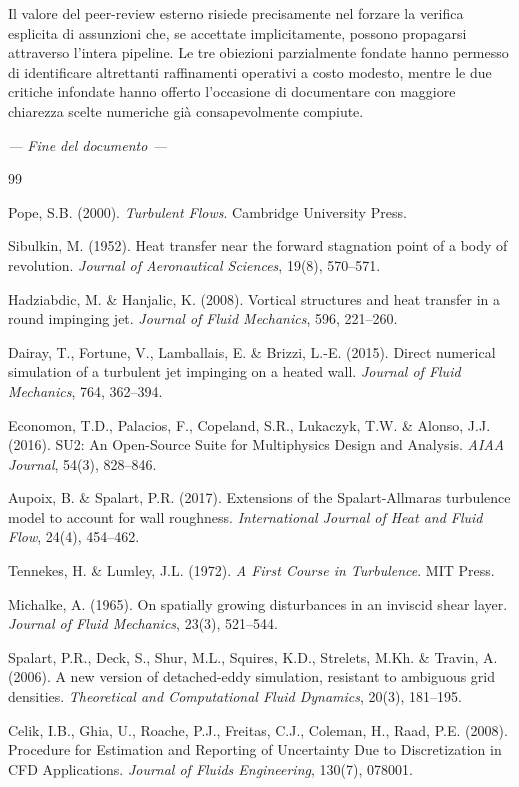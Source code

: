 \documentclass[11pt,a4paper]{article}
\begin{document}
Il valore del peer-review esterno risiede precisamente nel forzare
la verifica esplicita di assunzioni che, se accettate
implicitamente, possono propagarsi attraverso l'intera pipeline.
Le tre obiezioni parzialmente fondate hanno permesso di identificare
altrettanti raffinamenti operativi a costo modesto, mentre le due
critiche infondate hanno offerto l'occasione di documentare con
maggiore chiarezza scelte numeriche già consapevolmente compiute.

\bigskip
\centerline{\itshape\color{midblue}--- Fine del documento ---}

\newpage
\begin{thebibliography}{99}
\small

  Pope, S.B. (2000).
  \textit{Turbulent Flows}. Cambridge University Press.

  Sibulkin, M. (1952).
  Heat transfer near the forward stagnation point of a body of revolution.
  \textit{Journal of Aeronautical Sciences}, 19(8), 570--571.

  Hadziabdic, M. \& Hanjalic, K. (2008).
  Vortical structures and heat transfer in a round impinging jet.
  \textit{Journal of Fluid Mechanics}, 596, 221--260.

  Dairay, T., Fortune, V., Lamballais, E. \& Brizzi, L.-E. (2015).
  Direct numerical simulation of a turbulent jet impinging on a heated wall.
  \textit{Journal of Fluid Mechanics}, 764, 362--394.

  Economon, T.D., Palacios, F., Copeland, S.R., Lukaczyk, T.W. \& Alonso, J.J. (2016).
  SU2: An Open-Source Suite for Multiphysics Design and Analysis.
  \textit{AIAA Journal}, 54(3), 828--846.

  Aupoix, B. \& Spalart, P.R. (2017).
  Extensions of the Spalart-Allmaras turbulence model to account for
  wall roughness.
  \textit{International Journal of Heat and Fluid Flow}, 24(4), 454--462.

  Tennekes, H. \& Lumley, J.L. (1972).
  \textit{A First Course in Turbulence}. MIT Press.

  Michalke, A. (1965).
  On spatially growing disturbances in an inviscid shear layer.
  \textit{Journal of Fluid Mechanics}, 23(3), 521--544.

  Spalart, P.R., Deck, S., Shur, M.L., Squires, K.D., Strelets, M.Kh. \& Travin, A. (2006).
  A new version of detached-eddy simulation, resistant to ambiguous grid densities.
  \textit{Theoretical and Computational Fluid Dynamics}, 20(3), 181--195.

  Celik, I.B., Ghia, U., Roache, P.J., Freitas, C.J., Coleman, H., Raad, P.E. (2008).
  Procedure for Estimation and Reporting of Uncertainty Due to Discretization in CFD Applications.
  \textit{Journal of Fluids Engineering}, 130(7), 078001.

\end{thebibliography}
\end{document}
